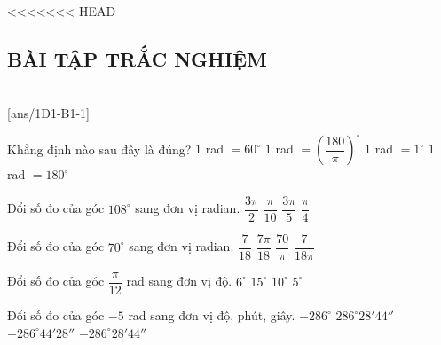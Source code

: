 <<<<<<< HEAD
\subsection{BÀI TẬP TRẮC NGHIỆM}

 \\
\setcounter{ex}{0}
[ans/1D1-B1-1]

\begin{ex}%
	Khẳng định nào sau đây là đúng?
	\choice
	{$1$ rad $=60^{\circ}$}
	{\True $1$ rad $={\left(\dfrac{180}{\pi}\right)}^{\circ}$}
	{$1$ rad $=1^{\circ}$}
	{$1$ rad $=180^{\circ}$}
\end{ex}

\begin{ex}%
	Đổi số đo của góc $108^{\circ}$ sang đơn vị radian.
	\choice
	{$\dfrac{3\pi}{2}$}
	{$\dfrac{\pi}{10}$}
	{\True $\dfrac{3\pi}{5}$}
	{$\dfrac{\pi}{4}$}
	\loigiai{
	}
\end{ex}


\begin{ex}%
	Đổi số đo của góc $70^{\circ}$ sang đơn vị radian.
	\choice
	{$\dfrac{7}{18}$}
	{\True $\dfrac{7\pi}{18}$}
	{$\dfrac{70}{\pi}$}
	{$\dfrac{7}{18\pi}$}
\end{ex}

\begin{ex}%
	Đổi số đo của góc $\dfrac{\pi}{12}$ rad sang đơn vị độ.
	\choice
	{$6^{\circ}$}
	{\True $15^{\circ}$}
	{$10^{\circ}$}
	{$5^{\circ}$}
\end{ex}

\begin{ex}%
	Đổi số đo của góc $-5$ rad sang đơn vị độ, phút, giây.
	\choice
	{$-286^{\circ}$}
	{$286^{\circ}28'44''$}
	{$-286^{\circ}44'28''$}
	{\True $-286^{\circ}28'44''$}
\end{ex}

